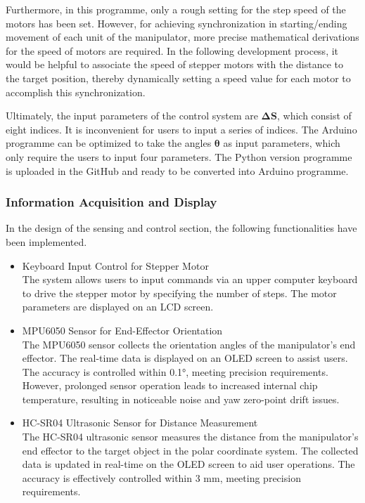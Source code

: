 Furthermore, in this programme, only a rough setting for the step speed of the motors has been set. However, for 
achieving synchronization in starting/ending movement of each unit of the manipulator, more precise mathematical 
derivations for the speed of motors are required. In the following development process, it would be helpful to 
associate the speed of stepper motors with the distance to the target position, thereby dynamically setting a 
speed value for each motor to accomplish this synchronization.

Ultimately, the input parameters of the control system are $\boldsymbol{\Delta S}$, which consist of eight indices. 
It is inconvenient for users to input a series of indices. The Arduino programme can be optimized to take the 
angles $\boldsymbol{\theta}$ as input parameters, which only require the users to input four parameters. The Python 
version programme is uploaded in the GitHub and ready to be converted into Arduino programme.
\subsubsection{Information Acquisition and Display}
In the design of the sensing and control section, the following functionalities have been implemented. 
\begin{itemize}
    \item Keyboard Input Control for Stepper Motor \\
    The system allows users to input commands via an upper computer keyboard to drive the stepper motor by specifying 
    the number of steps. The motor parameters are displayed on an LCD screen.
    \item MPU6050 Sensor for End-Effector Orientation \\
    The MPU6050 sensor collects the orientation angles of the manipulator’s end effector. The real-time data is displayed 
    on an OLED screen to assist users. The accuracy is controlled within 0.1°, meeting precision requirements. However, 
    prolonged sensor operation leads to increased internal chip temperature, resulting in noticeable noise and yaw zero-point 
    drift issues.
    \item HC-SR04 Ultrasonic Sensor for Distance Measurement \\
    The HC-SR04 ultrasonic sensor measures the distance from the manipulator’s end effector to the target object in 
    the polar coordinate system. The collected data is updated in real-time on the OLED screen to aid user operations. 
    The accuracy is effectively controlled within 3 mm, meeting precision requirements.
\end{itemize}

